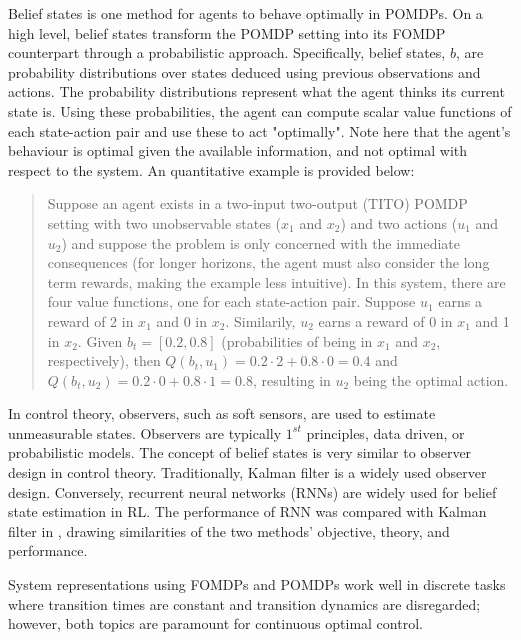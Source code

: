 Belief states is one method for agents to behave optimally in POMDPs. On a high level, belief states transform the POMDP setting into its FOMDP counterpart through a probabilistic approach. Specifically, belief states, $b$, are probability distributions over states deduced using previous observations and actions. The probability distributions represent what the agent thinks its current state is. Using these probabilities, the agent can compute scalar value functions of each state-action pair and use these to act "optimally".  Note here that the agent's behaviour is optimal given the available information, and not optimal with respect to the system. An quantitative example is provided below:
\begin{quote}
    Suppose an agent exists in a two-input two-output (TITO) POMDP setting with two unobservable states ($x_1$ and $x_2$) and two actions ($u_1$ and $u_2$) and suppose the problem is only concerned with the immediate consequences (for longer horizons, the agent must also consider the long term rewards, making the example less intuitive). In this system, there are four value functions, one for each state-action pair. Suppose $u_1$ earns a reward of 2 in $x_1$ and 0 in $x_2$.  Similarily, $u_2$ earns a reward of 0 in $x_1$ and 1 in $x_2$.  Given $b_t = [0.2, 0.8]$ (probabilities of being in $x_1$ and $x_2$, respectively), then $Q(b_t, u_1) = 0.2 \cdot 2 + 0.8 \cdot 0 = 0.4$ and $Q(b_t, u_2) = 0.2 \cdot 0 + 0.8 \cdot 1 = 0.8$, resulting in $u_2$ being the optimal action.
\end{quote}

In control theory, observers, such as soft sensors, are used to estimate unmeasurable states.  Observers are typically $1^{st}$ principles, data driven, or probabilistic models. The concept of belief states is very similar to observer design in control theory. Traditionally, Kalman filter is a widely used observer design. Conversely, recurrent neural networks (RNNs) are widely used for belief state estimation in RL. The performance of RNN was compared with Kalman filter in \cite{RNNvsKF}, drawing similarities of the two methods' objective, theory, and performance.

System representations using FOMDPs and POMDPs work well in discrete tasks where transition times are constant and transition dynamics are disregarded; however, both topics are paramount for continuous optimal control.  







